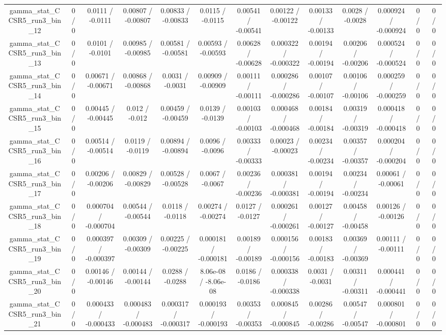 \documentclass[10pt]{article}
\begin{document}
\begin{table}[htbp]
\begin{center}
\begin{tabular}{|c|c|c|c|c|c|c|c|c|c|c|c|c|}
  gamma_stat_CCSR5_run3_bin_12 & 0 / 0 & 0.0111 / -0.0111 & 0.00807 / -0.00807 & 0.00833 / -0.00833 & 0.0115 / -0.0115 & 0.00541 / -0.00541 & 0.00122 / -0.00122 & 0.00133 / -0.00133 & 0.0028 / -0.0028 & 0.000924 / -0.000924 & 0 / 0 & 0 / 0 \\ 
  gamma_stat_CCSR5_run3_bin_13 & 0 / 0 & 0.0101 / -0.0101 & 0.00985 / -0.00985 & 0.00581 / -0.00581 & 0.00593 / -0.00593 & 0.00628 / -0.00628 & 0.000322 / -0.000322 & 0.00194 / -0.00194 & 0.00206 / -0.00206 & 0.000524 / -0.000524 & 0 / 0 & 0 / 0 \\ 
  gamma_stat_CCSR5_run3_bin_14 & 0 / 0 & 0.00671 / -0.00671 & 0.00868 / -0.00868 & 0.0031 / -0.0031 & 0.00909 / -0.00909 & 0.00111 / -0.00111 & 0.000286 / -0.000286 & 0.00107 / -0.00107 & 0.00106 / -0.00106 & 0.000259 / -0.000259 & 0 / 0 & 0 / 0 \\ 
  gamma_stat_CCSR5_run3_bin_15 & 0 / 0 & 0.00445 / -0.00445 & 0.012 / -0.012 & 0.00459 / -0.00459 & 0.0139 / -0.0139 & 0.00103 / -0.00103 & 0.000468 / -0.000468 & 0.00184 / -0.00184 & 0.00319 / -0.00319 & 0.000418 / -0.000418 & 0 / 0 & 0 / 0 \\ 
  gamma_stat_CCSR5_run3_bin_16 & 0 / 0 & 0.00514 / -0.00514 & 0.0119 / -0.0119 & 0.00894 / -0.00894 & 0.0096 / -0.0096 & 0.00333 / -0.00333 & 0.00023 / -0.00023 & 0.00234 / -0.00234 & 0.00357 / -0.00357 & 0.000204 / -0.000204 & 0 / 0 & 0 / 0 \\ 
  gamma_stat_CCSR5_run3_bin_17 & 0 / 0 & 0.00206 / -0.00206 & 0.00829 / -0.00829 & 0.00528 / -0.00528 & 0.0067 / -0.0067 & 0.00236 / -0.00236 & 0.000381 / -0.000381 & 0.00194 / -0.00194 & 0.00234 / -0.00234 & 0.00061 / -0.00061 & 0 / 0 & 0 / 0 \\ 
  gamma_stat_CCSR5_run3_bin_18 & 0 / 0 & 0.000704 / -0.000704 & 0.00544 / -0.00544 & 0.0118 / -0.0118 & 0.00274 / -0.00274 & 0.0127 / -0.0127 & 0.000261 / -0.000261 & 0.00127 / -0.00127 & 0.00458 / -0.00458 & 0.00126 / -0.00126 & 0 / 0 & 0 / 0 \\ 
  gamma_stat_CCSR5_run3_bin_19 & 0 / 0 & 0.000397 / -0.000397 & 0.00309 / -0.00309 & 0.00225 / -0.00225 & 0.000181 / -0.000181 & 0.00189 / -0.00189 & 0.000156 / -0.000156 & 0.00183 / -0.00183 & 0.00369 / -0.00369 & 0.00111 / -0.00111 & 0 / 0 & 0 / 0 \\ 
  gamma_stat_CCSR5_run3_bin_20 & 0 / 0 & 0.00146 / -0.00146 & 0.00144 / -0.00144 & 0.0288 / -0.0288 & 8.06e-08 / -8.06e-08 & 0.0186 / -0.0186 & 0.000338 / -0.000338 & 0.0031 / -0.0031 & 0.00311 / -0.00311 & 0.000441 / -0.000441 & 0 / 0 & 0 / 0 \\ 
  gamma_stat_CCSR5_run3_bin_21 & 0 / 0 & 0.000433 / -0.000433 & 0.000483 / -0.000483 & 0.000317 / -0.000317 & 0.000193 / -0.000193 & 0.00353 / -0.00353 & 0.000845 / -0.000845 & 0.00286 / -0.00286 & 0.00547 / -0.00547 & 0.000801 / -0.000801 & 0 / 0 & 0 / 0 \\ 

\end{tabular}
\end{center}
\end{table}
\end{document}
